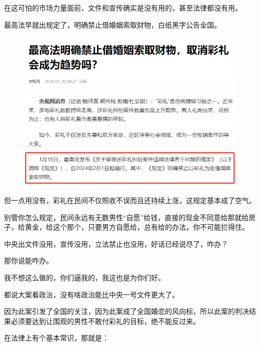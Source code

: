 \documentclass[UTF8,11pt,oneside]{ctexart}
\begin{document}
在这可怕的市场力量面前，文件和宣传确实是没有用的，甚至法律都没有用。

最高法早就出规定了，明确禁止借婚姻索取财物，白纸黑字公告全国。

\begin{figure}[H]
    \centering
    \includegraphics[width=13cm]{2025-04-17-010.png}
\end{figure}

但一点用没有，彩礼在民间不仅照收不误而且还持续上涨，这规定基本成了空气。

别管你怎么规定，民间永远有无数男性“自愿”给钱，直接的现金不同意给那就给房子，给黄金，给这个那个，只要男方自愿给，总有给的办法，你不可能拦得住。


中央出文件没用，宣传没用，立法禁止也没用，好话已经说尽了，咋办？

那你说能咋办。

我不想这么做的，你们逼我的，我这也是为你们好。


都说大案看政治，没有啥政治能比中央一号文件更大了。

因为此案引发了全国的关注，因为此案成了全国婚恋的风向标，所以此案的判决结果必须要达到让围观的男性不敢付彩礼的目标，绝不能反过来。

在法律上有个基本常识，那就是：

\end{document}

